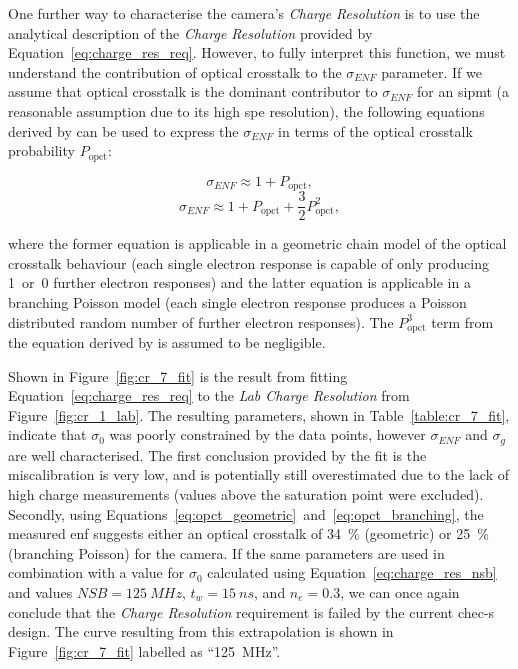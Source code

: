 One further way to characterise the camera's \textit{Charge Resolution} is to use the analytical description of the \textit{Charge Resolution} provided by Equation~\ref{eq:charge_res_req}. However, to fully interpret this function, we must understand the contribution of optical crosstalk to the $\sigma_{ENF}$ parameter. If we assume that optical crosstalk is the dominant contributor to $\sigma_{ENF}$ for an \gls{sipmt} (a reasonable assumption due to its high \gls{spe} resolution), the following equations derived by \textcite{Vinogradov2012} can be used to express the $\sigma_{ENF}$ in terms of the optical crosstalk probability $P_\text{opct}$:
\begin{minipage}{\textwidth}
\begin{equation} \label{eq:opct_geometric}
\sigma_{ENF} \approx 1 + P_\text{opct},
\end{equation}
\begin{equation} \label{eq:opct_branching}
\sigma_{ENF} \approx 1 + P_\text{opct} + \frac{3}{2} P_\text{opct}^2,
\end{equation}
\end{minipage}
where the former equation is applicable in a geometric chain model of the optical crosstalk behaviour (each single electron response is capable of only producing 1~or~0 further electron responses) and the latter equation is applicable in a branching Poisson model (each single electron response produces a Poisson distributed random number of further electron responses). The $P_\text{opct}^3$ term from the equation derived by \textcite{Vinogradov2012} is assumed to be negligible.

Shown in Figure~\ref{fig:cr_7_fit} is the result from fitting Equation~\ref{eq:charge_res_req} to the \textit{Lab Charge Resolution} from Figure~\ref{fig:cr_1_lab}. The resulting parameters, shown in Table~\ref{table:cr_7_fit}, indicate that $\sigma_0$ was poorly constrained by the data points, however $\sigma_{ENF}$ and $\sigma_g$ are well characterised. The first conclusion provided by the fit is the miscalibration is very low, and is potentially still overestimated due to the lack of high charge measurements (values above the saturation point were excluded). Secondly, using Equations~\ref{eq:opct_geometric}~and~\ref{eq:opct_branching}, the measured \gls{enf} suggests either an optical crosstalk of \SI{34}{\percent} (geometric) or \SI{25}{\percent} (branching Poisson) for the camera. If the same parameters are used in combination with a value for $\sigma_0$ calculated using Equation~\ref{eq:charge_res_nsb} and values $\mathit{NSB} = \SI{125}{MHz}$, $t_w = \SI{15}{ns}$, and $n_e = 0.3$, we can once again conclude that the \textit{Charge Resolution} requirement is failed by the current \gls{chec-s} design. The curve resulting from this extrapolation is shown in Figure~\ref{fig:cr_7_fit} labelled as ``\SI{125}{MHz}''.

